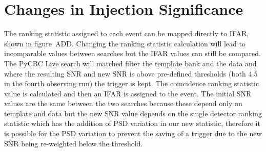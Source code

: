 \section{\label{sec:pycbclive-injection-investigations}Changes in Injection Significance}

The ranking statistic assigned to each event can be mapped directly to IFAR, shown in figure~ADD. Changing the ranking statistic calculation will lead to incomparable values between searches but the IFAR values can still be compared. The PyCBC Live search will matched filter the template bank and the data and where the resulting SNR and new SNR is above pre-defined thresholds (both $4.5$ in the fourth observing run) the trigger is kept. The coincidence ranking statistic value is calculated and then an IFAR is assigned to the event. The initial SNR values are the same between the two searches because these depend only on template and data but the new SNR value depends on the single detector ranking statistic which has the addition of PSD variation in our new statistic, therefore it is possible for the PSD variation to prevent the saving of a trigger due to the new SNR being re-weighted below the threshold.
%
%

